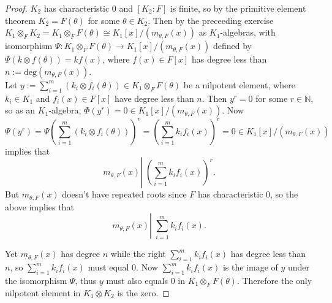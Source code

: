 \documentclass{article}
\begin{document}
  \begin{proof}
    $K_2$ has characteristic 0 and $[K_2:F]$ is finite, so by the primitive
    element theorem $K_2=F(\theta)$ for some $\theta\in K_2$. Then by the
    preceeding exercise $K_1\otimes_F K_2 =K_1\otimes_F F(\theta) \cong
    K_1[x]/(m_{\theta,F}(x))$ as $K_1$-algebras, with isomorphism
    $\Psi:K_1\otimes_F F(\theta) \rightarrow K_1[x]/(m_{\theta,F}(x))$
    defined by $\Psi(k\otimes f(\theta)) =kf(x)$, where $f(x)\in F[x]$ has
    degree less than $n:=\text{deg}(m_{\theta,F}(x))$. \\

    Let $y:=\sum_{i=1}^m (k_i\otimes f_i(\theta)) \in K_1\otimes_F
    F(\theta)$ be a nilpotent element, where $k_i\in K_1$ and $f_i(x)\in
    F[x]$ have degree less than $n$. Then $y^r=0$ for some
    $r\in\mathbb{N}$, so as an $K_1$-algebra, $\Phi(y^r)=0\in
    K_1[x]/(m_{\theta,F}(x))$. Now
    \[\Psi(y^r) =\Psi\left(\sum_{i=1}^m (k_i\otimes f_i(\theta)) \right)^r
    =\left(\sum_{i=1}^m k_if_i(x) \right)^r =0\in
    K_1[x]/(m_{\theta,F}(x))\]
    implies that 
    \[m_{\theta,F}(x) \left|\; \left(\sum_{i=1}^m k_if_i(x) \right)^r
    \right..\]
    But $m_{\theta,F}(x)$ doesn't have repeated roots since $F$ has
    characteristic 0, so the above implies that
    \[m_{\theta,F}(x) \left|\; \sum_{i=1}^m k_if_i(x) \right..\]

    Yet $m_{\theta,F}(x)$ has degree $n$ while the right $\sum_{i=1}^m
    k_if_i(x)$ has degree less than $n$, so $\sum_{i=1}^m k_if_i(x)$ must
    equal 0. Now $\sum_{i=1}^m k_if_i(x)$ is the image of $y$ under the
    isomorphism $\Psi$, thus $y$ must also equals 0 in $K_1\otimes_F
    F(\theta)$. Therefore the only nilpotent element in $K_1\otimes K_2$
    is the zero.
  \end{proof}
\end{document}
